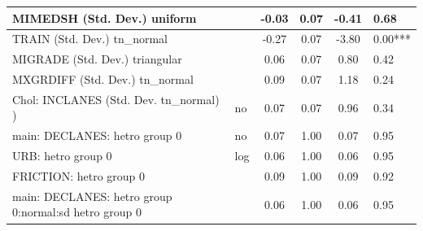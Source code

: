 \begin{table}
\begin{center}
\begin{tabular}{|l|l|c|c|c|l|}
			\hline
			MIMEDSH (Std. Dev.) uniform &  & -0.03 & 0.07 & -0.41 & 0.68 \\
			\hline
			TRAIN (Std. Dev.) tn_normal &  & -0.27 & 0.07 & -3.80 & 0.00*** \\
			\hline
			MIGRADE (Std. Dev.) triangular &  & 0.06 & 0.07 & 0.80 & 0.42 \\
			\hline
			MXGRDIFF (Std. Dev.) tn_normal &  & 0.09 & 0.07 & 1.18 & 0.24 \\
			\hline
			 Chol: INCLANES (Std. Dev. tn_normal) ) & no & 0.07 & 0.07 & 0.96 & 0.34 \\
			\hline
			main: DECLANES: hetro group 0 & no & 0.07 & 1.00 & 0.07 & 0.95 \\
			\hline
			URB: hetro group 0 & log & 0.06 & 1.00 & 0.06 & 0.95 \\
			\hline
			FRICTION: hetro group 0 &  & 0.09 & 1.00 & 0.09 & 0.92 \\
			\hline
			main: DECLANES: hetro group 0:normal:sd  hetro group 0 &  & 0.06 & 1.00 & 0.06 & 0.95 \\
			\hline
		\end{tabular}
	\end{center}
\end{table}